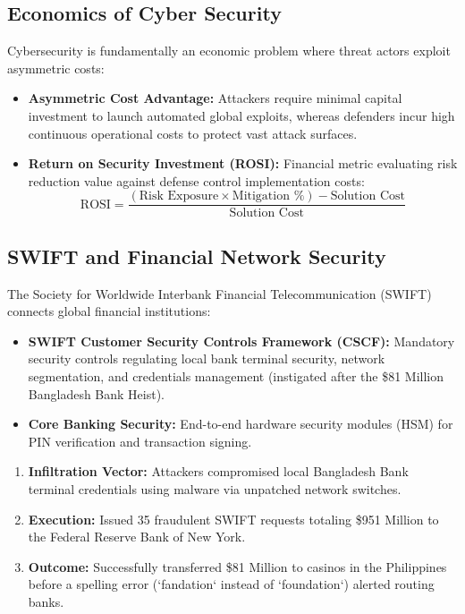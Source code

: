\documentclass[12pt,a4paper]{article}
\begin{document}
\subsection{Economics of Cyber Security}
Cybersecurity is fundamentally an economic problem where threat actors exploit asymmetric costs:
\begin{itemize}[leftmargin=*, itemsep=3pt]
  \item \textbf{Asymmetric Cost Advantage:} Attackers require minimal capital investment to launch automated global exploits, whereas defenders incur high continuous operational costs to protect vast attack surfaces.
  \item \textbf{Return on Security Investment (ROSI):} Financial metric evaluating risk reduction value against defense control implementation costs:
  \[
  \text{ROSI} = \frac{(\text{Risk Exposure} \times \text{Mitigation \%}) - \text{Solution Cost}}{\text{Solution Cost}}
  \]
\end{itemize}

\subsection{SWIFT and Financial Network Security}
The Society for Worldwide Interbank Financial Telecommunication (SWIFT) connects global financial institutions:
\begin{itemize}[leftmargin=*, itemsep=3pt]
  \item \textbf{SWIFT Customer Security Controls Framework (CSCF):} Mandatory security controls regulating local bank terminal security, network segmentation, and credentials management (instigated after the \$81 Million Bangladesh Bank Heist).
  \item \textbf{Core Banking Security:} End-to-end hardware security modules (HSM) for PIN verification and transaction signing.
\end{itemize}

\begin{tcolorbox}[examplebox, title={\textbf{Real-World Case Study: Bangladesh Bank SWIFT Heist (2016)}}]
\begin{enumerate}[leftmargin=*, itemsep=3pt]
  \item \textbf{Infiltration Vector:} Attackers compromised local Bangladesh Bank terminal credentials using malware via unpatched network switches.
  \item \textbf{Execution:} Issued 35 fraudulent SWIFT requests totaling \$951 Million to the Federal Reserve Bank of New York.
  \item \textbf{Outcome:} Successfully transferred \$81 Million to casinos in the Philippines before a spelling error (`fandation` instead of `foundation`) alerted routing banks.
\end{enumerate}
\end{tcolorbox}
\end{document}
